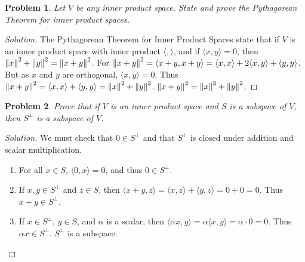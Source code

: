 \documentclass{article}
\theoremstyle{mystyle}
\newtheorem{problem}{Problem}[section]
\begin{document}
\begin{problem}
Let $V$ be any inner product space. State and prove the Pythagorean Theorem for inner product spaces.
\end{problem}
\begin{proof}[Solution]
The Pythagorean Theorem for Inner Product Spaces state that if $V$ is an inner product space with inner product $\langle, \rangle$, and if $\langle x,y\rangle = 0$, then $\norm{x}^2+\norm{y}^2 = \norm{x+y}^2$. For $\norm{x+y}^2 = \langle x+y,x+y\rangle = \langle x,x\rangle + 2\langle x,y\rangle +\langle y,y\rangle$. But as $x$ and $y$ are orthogonal, $\langle x,y \rangle = 0$. Thus $\norm{x+y}^2 = \langle x,x\rangle + \langle y,y\rangle = \norm{x}^2+\norm{y}^2$. $\norm{x+y}^2 =\norm{x}^2+\norm{y}^2$.
\end{proof}
\begin{problem}
Prove that if $V$ is an inner product space and $S$ is a subspace of $V$, then $S^{\perp}$ is a subspace of $V$.
\end{problem}
\begin{proof}[Solution]
We must check that $0\in S^{\perp}$ and that $S^{\perp}$ is closed under addition and scalar multiplication.
\begin{enumerate}
    \item For all $x\in S$, $\langle 0,x \rangle = 0$, and thus $0\in S^{\perp}$.
    \item If $x,y\in S^{\perp}$ and $z\in S$, then $\langle x+y,z\rangle = \langle x,z\rangle + \langle y,z\rangle = 0+0=0$. Thus $x+y\in S^{\perp}$.
    \item If $x\in S^{\perp}$, $y\in S$, and $\alpha$ is a scalar, then $\langle \alpha x,y \rangle = \alpha \langle x,y \rangle = \alpha \cdot 0 = 0$. Thus $\alpha x \in S^{\perp}$. $S^{\perp}$ is a subspace.
\end{enumerate}
\end{proof}
\clearpage
\printglossaries
\end{document}
